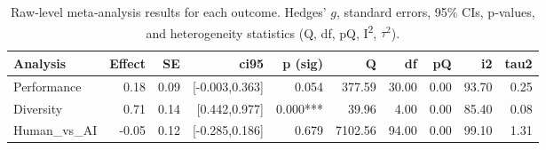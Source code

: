 \begin{table}[ht]
\centering
\begin{tabular}{lrrrrrrrrr}
  \toprule
Analysis & Effect & SE & ci95 & p (sig) & Q & df & pQ & i2 & tau2 \\ 
  \midrule
Performance & 0.18 & 0.09 & [-0.003,0.363] & 0.054 & 377.59 & 30.00 & 0.00 & 93.70 & 0.25 \\ 
  Diversity & 0.71 & 0.14 & [0.442,0.977] & 0.000*** & 39.96 & 4.00 & 0.00 & 85.40 & 0.08 \\ 
  Human_vs_AI & -0.05 & 0.12 & [-0.285,0.186] & 0.679 & 7102.56 & 94.00 & 0.00 & 99.10 & 1.31 \\ 
   \bottomrule
\end{tabular}
\caption{Raw‐level meta‐analysis results for each outcome. Hedges’ $g$, standard errors, 95\% CIs, p‐values, and heterogeneity statistics (Q, df, pQ, I\textsuperscript{2}, $\tau^2$).} 
\label{tab:meta_raw}
\end{table}

